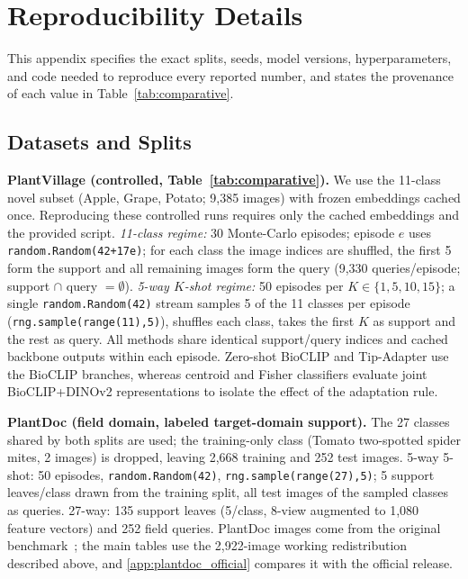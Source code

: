 \appendix
\section{Reproducibility Details}
\label{app:repro}
This appendix specifies the exact splits, seeds, model versions, hyperparameters, and code needed to reproduce every reported number, and states the provenance of each value in Table~\ref{tab:comparative}.

\subsection{Datasets and Splits}
\textbf{PlantVillage (controlled, Table~\ref{tab:comparative}).} We use the 11-class novel subset (Apple, Grape, Potato; 9{,}385 images) with frozen embeddings cached once. Reproducing these controlled runs requires only the cached embeddings and the provided script. \emph{11-class regime:} 30 Monte-Carlo episodes; episode $e$ uses \texttt{random.Random(42+17e)}; for each class the image indices are shuffled, the first 5 form the support and all remaining images form the query (9{,}330 queries/episode; support $\cap$ query $=\emptyset$). \emph{5-way $K$-shot regime:} 50 episodes per $K\in\{1,5,10,15\}$; a single \texttt{random.Random(42)} stream samples 5 of the 11 classes per episode (\texttt{rng.sample(range(11),5)}), shuffles each class, takes the first $K$ as support and the rest as query. All methods share identical support/query indices and cached backbone outputs within each episode. Zero-shot BioCLIP and Tip-Adapter use the BioCLIP branches, whereas centroid and Fisher classifiers evaluate joint BioCLIP+DINOv2 representations to isolate the effect of the adaptation rule.

\textbf{PlantDoc (field domain, labeled target-domain support).} The 27 classes shared by both splits are used; the training-only class (Tomato two-spotted spider mites, 2 images) is dropped, leaving 2{,}668 training and 252 test images. 5-way 5-shot: 50 episodes, \texttt{random.Random(42)}, \texttt{rng.sample(range(27),5)}; 5 support leaves/class drawn from the training split, all test images of the sampled classes as queries. 27-way: 135 support leaves (5/class, 8-view augmented to 1{,}080 feature vectors) and 252 field queries. PlantDoc images come from the original benchmark~\cite{singh2020plantdoc}; the main tables use the 2{,}922-image working redistribution described above, and \ref{app:plantdoc_official} compares it with the official release.

